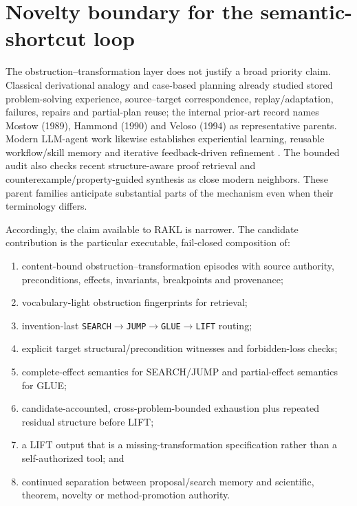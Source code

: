 \section{Novelty boundary for the semantic-shortcut loop}
\label{sec:semantic-shortcut-novelty}

The obstruction--transformation layer does not justify a broad priority claim. Classical derivational analogy and case-based planning already studied stored problem-solving experience, source--target correspondence, replay/adaptation, failures, repairs and partial-plan reuse; the internal prior-art record names Mostow (1989), Hammond (1990) and Veloso (1994) as representative parents. Modern LLM-agent work likewise establishes experiential learning, reusable workflow/skill memory and iterative feedback-driven refinement \cite{shinn2023reflexion,zhao2023expel,wang2024awm,wang2026autoskills,zhang2026memskill}. The bounded audit also checks recent structure-aware proof retrieval and counterexample/property-guided synthesis as close modern neighbors. These parent families anticipate substantial parts of the mechanism even when their terminology differs.

Accordingly, the claim available to RAKL is narrower. The candidate contribution is the particular executable, fail-closed composition of:
\begin{enumerate}[leftmargin=*]
\item content-bound obstruction--transformation episodes with source authority, preconditions, effects, invariants, breakpoints and provenance;
\item vocabulary-light obstruction fingerprints for retrieval;
\item invention-last \texttt{SEARCH}$\rightarrow$\texttt{JUMP}$\rightarrow$\texttt{GLUE}$\rightarrow$\texttt{LIFT} routing;
\item explicit target structural/precondition witnesses and forbidden-loss checks;
\item complete-effect semantics for SEARCH/JUMP and partial-effect semantics for GLUE;
\item candidate-accounted, cross-problem-bounded exhaustion plus repeated residual structure before LIFT;
\item a LIFT output that is a missing-transformation specification rather than a self-authorized tool; and
\item continued separation between proposal/search memory and scientific, theorem, novelty or method-promotion authority.
\end{enumerate}

